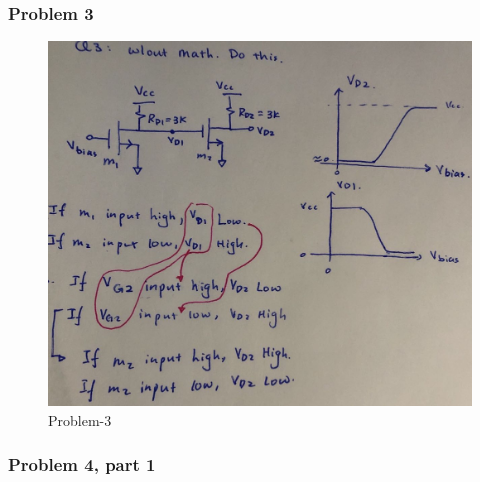 \documentclass[11pt]{article}
\begin{document}
    \hypertarget{problem-3}{%
\subsubsection{Problem 3}\label{problem-3}}

\begin{figure}
\centering
\includegraphics{./image/Q3-sol.jpg}
\caption{Problem-3}
\end{figure}

    \hypertarget{problem-4-part-1}{%
\subsubsection{Problem 4, part 1}\label{problem-4-part-1}}
\end{document}
